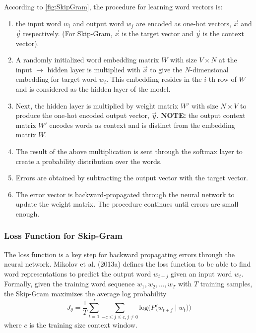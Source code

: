 According to \cref{fig:SkipGram}, the procedure for learning word vectors is: 
\begin{enumerate}
    \item the input word $w_i$ and output word $w_j$ are encoded as one-hot vectors, $\overrightarrow{x}$ and $\overrightarrow{y}$ respectively. (For Skip-Gram, $\overrightarrow{x}$ is the target vector and $\overrightarrow{y}$ is the context vector). 
    
    \item A randomly initialized word embedding matrix $W$ with size $V \times N$ at the input $\rightarrow$ hidden layer is multiplied with $\overrightarrow{x}$ to give the $N$-dimensional embedding for target word $w_i$. This embedding resides in the $i$-th row of $W$ and is considered as the hidden layer of the model. 
    
    \item Next, the hidden layer is multiplied by weight matrix $W'$ with size $N \times V$ to produce the one-hot encoded output vector, $\overrightarrow{y}$. \textbf{NOTE: }the output context matrix $W'$ encodes words as context and is distinct from the embedding matrix $W$. 
    
    \item The result of the above multiplication is sent through the softmax layer to create a probability distribution over the words. 
    
    \item Errors are obtained by subtracting the output vector with the target vector. 
    
    \item The error vector is backward-propagated through the neural network to update the weight matrix. The procedure continues until errors are small enough. 
    
\end{enumerate}


\subsubsection{Loss Function for Skip-Gram}

The loss function is a key step for backward propagating errors through the neural network. Mikolov et al. (2013a) defines the loss function to be able to find word representations to predict the output word $w_{t+j}$ given an input word $w_t$. Formally, given the training word sequence $w_1, w_2, ..., w_T$ with $T$ training samples, the Skip-Gram maximizes the average log probability
$$
J_\theta = \frac{1}{T} \sum_{t=1}^T \sum_{-c \leq j \leq c, j \neq 0} \text{log} \Big(P \Big(w_{t+j} \;| \; w_t \Big) \Big)
$$
where $c$ is the training size context window. 

